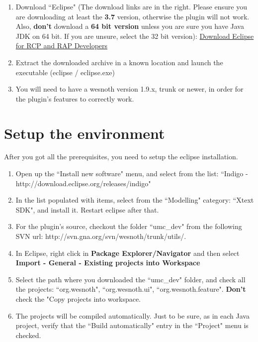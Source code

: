 \documentclass[10pt]{article}
\begin{document}
\begin{enumerate}
\item Download ``Eclipse" (The download links are in the right. Please ensure you are downloading at least the \textbf{3.7} version, otherwise the plugin will not work. Also, \textbf{don't} download a \textbf{64 bit version} unless you are sure you have Java JDK on 64 bit. If you are unsure, select the 32 bit version):  \href{http://eclipse.org/downloads/packages/eclipse-rcp-and-rap-developers/indigor}{Download Eclipse for RCP and RAP Developers}

\item Extract the downloaded archive in a known location and launch the executable (eclipse / eclipse.exe)

\item You will need to have a wesnoth version 1.9.x, trunk or newer, in order for the plugin's features to correctly work.
\end{enumerate}

\section{Setup the environment}
After you got all the prerequisites, you need to setup the eclipse installation.

\begin{enumerate}
\item Open up the ``Install new software" menu, and select from the list: ``Indigo - http://download.eclipse.org/releases/indigo"

\item In the list populated with items, select from the ``Modelling" category: ``Xtext SDK", and install it. Restart eclipse after that.

\item For the plugin's source, checkout the folder ``umc\_dev" from the following SVN url: http://svn.gna.org/svn/wesnoth/trunk/utils/.

\item In Eclipse, right click in \textbf{Package Explorer/Navigator} and then select \textbf{Import - General - Existing projects into Workspace}

\item Select the path where you downloaded the ``umc\_dev" folder, and check all the projects: ``org.wesnoth", ``org.wesnoth.ui", ``org.wesnoth.feature". \textbf{Don't} check the "Copy projects into workspace.

\item The projects will be compiled automatically. Just to be sure, as in each Java project, verify that the ``Build automatically" entry in the ``Project" menu is checked.
\end{enumerate}
\end{document}
